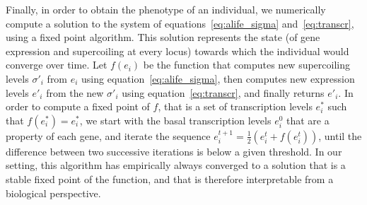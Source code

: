 Finally, in order to obtain the phenotype of an individual, we numerically compute a solution to the system of equations~\ref{eq:alife_sigma} and~\ref{eq:transcr}, using a fixed point algorithm.
This solution represents the state (of gene expression and supercoiling at every locus) towards which the individual would converge over time.
Let $f(e_i)$ be the function that computes new supercoiling levels $\sigma'_i$ from $e_i$ using equation~\ref{eq:alife_sigma}, then computes new expression levels $e'_i$ from the new $\sigma'_i$ using equation~\ref{eq:transcr}, and finally returns $e'_i$.
In order to compute a fixed point of $f$, that is a set of transcription levels $e_i^*$ such that $f(e_i^*) = e_i^*$, we start with the basal transcription levels $e_i^0$ that are a property of each gene, and iterate the sequence $e_i^{t+1} = \frac{1}{2}(e_i^t + f(e_i^t))$, until the difference between two successive iterations is below a given threshold.
In our setting, this algorithm has empirically always converged to a solution that is a stable fixed point of the function, and that is therefore interpretable from a biological perspective.

